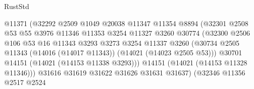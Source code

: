 \begin{lexlean}{RustStd}
\begin{coremodule}
                                        @11371
                                        (@32292
                                          @2509
                                          @1049
                                          @20038
                                          @11347
                                          @11354
                                          @8894
                                          (@32301
                                            @2508
                                            @53
                                            @55
                                            @3976
                                            @11346
                                            @11353
                                            @3254
                                            @11327
                                            @3260
                                            @30774
                                            (@32300
                                              @2506
                                              @106
                                              @53
                                              @16
                                              @11343
                                              @3293
                                              @3273
                                              @3254
                                              @11337
                                              @3260
                                              (@30734
                                                @2505
                                                @11343
                                                (@14016 (@14017 @11343))
                                                (@14021 (@14023 @2505 @53)))
                                              @30701
                                              @14151
                                              (@14021 (@14153 @11338 @3293)))
                                            @14151
                                            (@14021 (@14153 @11328 @11346)))
                                          @31616
                                          @31619
                                          @31622
                                          @31626
                                          @31631
                                          @31637)
                                        (@32346
                                          @11356
                                          @2517
                                          @2524

\end{coremodule}
\end{lexlean}
